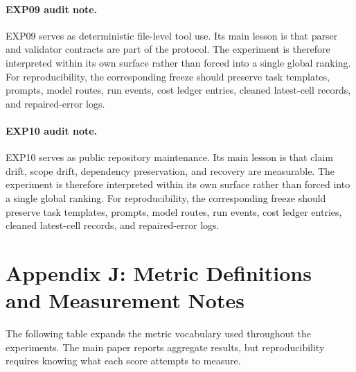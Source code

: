 \documentclass[11pt]{article}
\begin{document}
\paragraph{EXP09 audit note.} EXP09 serves as deterministic file-level tool use. Its main lesson is that parser and validator contracts are part of the protocol. The experiment is therefore interpreted within its own surface rather than forced into a single global ranking. For reproducibility, the corresponding freeze should preserve task templates, prompts, model routes, run events, cost ledger entries, cleaned latest-cell records, and repaired-error logs.


\paragraph{EXP10 audit note.} EXP10 serves as public repository maintenance. Its main lesson is that claim drift, scope drift, dependency preservation, and recovery are measurable. The experiment is therefore interpreted within its own surface rather than forced into a single global ranking. For reproducibility, the corresponding freeze should preserve task templates, prompts, model routes, run events, cost ledger entries, cleaned latest-cell records, and repaired-error logs.



\section{Appendix J: Metric Definitions and Measurement Notes}
The following table expands the metric vocabulary used throughout the experiments. The main paper reports aggregate results, but reproducibility requires knowing what each score attempts to measure.
\end{document}
